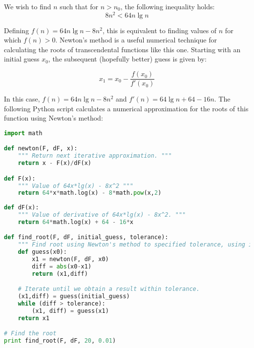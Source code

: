 \documentclass[a4paper,12pt]{article}
\begin{document}

We wish to find $n$ such that for $n > n_0$, the following inequality holds:
\[ 8n^2 < 64n \lg n\]

Defining $f(n) = 64n \lg n - 8n^2$, this is equivalent to finding values of $n$ for which 
$f(n) > 0$. Newton's method is a useful numerical technique for calculating the roots 
of transcendental functions like this one. Starting with an initial guess $x_0$, the 
subsequent (hopefully better) guess is given by:

\[ x_1 = x_0 - \frac{f(x_0)}{f'(x_0)} \]

In this case, $f(n) = 64n \lg n - 8n^2$ and $f'(n) = 64\lg n + 64- 16n$. The following Python script calculates a numerical 
approximation for the roots of this function using Newton's method:

\begin{lstlisting}[language=Python]
import math

def newton(F, dF, x):
    """ Return next iterative approximation. """
    return x - F(x)/dF(x)

def F(x):
    """ Value of 64x*lg(x) - 8x^2 """
    return 64*x*math.log(x) - 8*math.pow(x,2)
    
def dF(x):
    """ Value of derivative of 64x*lg(x) - 8x^2. """
    return 64*math.log(x) + 64 - 16*x

def find_root(F, dF, initial_guess, tolerance):
    """ Find root using Newton's method to specified tolerance, using initial guess. """
    def guess(x0):
        x1 = newton(F, dF, x0)
        diff = abs(x0-x1)
        return (x1,diff)

    # Iterate until we obtain a result within tolerance.                                                   
    (x1,diff) = guess(initial_guess)
    while (diff > tolerance):
        (x1, diff) = guess(x1)
    return x1

# Find the root                                                                                            
print find_root(F, dF, 20, 0.01)
\end{lstlisting}
\end{document}
